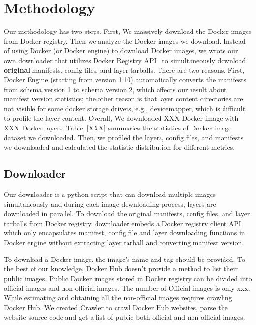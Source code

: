 
\section{Methodology}

Our methodology has two steps. First, We massively download the Docker images from Docker registry. Then we analyze the Docker images we download. Instead of using Docker (or Docker engine) to download Docker images, we wrote our own downloader that utilizes Docker Registry API~\cite{} to simultaneously download \textbf{original} manifests, config files, and layer tarballs. There are two reasons. First, Docker Engine (starting from version 1.10) automatically converts the manifests from schema version 1 to schema version 2, which affects our result about manifest version statistics; the other reason is that layer content directories are not visible for some docker storage drivers, e.g., devicemapper, which is difficult to profile the layer content. Overall, We downloaded XXX Docker image with XXX Docker layers. Table~\ref{XXX} summaries the statistics of Docker image dataset we downloaded. Then, we profiled the layers, config files, and manifests we downloaded and calculated the statistic distribution for different metrics. 


\subsection{Downloader}

Our downloader is a python script that can download multiple images simultaneously and during each image downloading process, layers are downloaded in parallel. To download the original manifests, config files, and layer tarballs from Docker registry, downloader embeds a Docker registry client API~\cite{xxx} which only encapsulates manifest, config file and layer downloading functions in Docker engine without extracting layer tarball and converting manifest version. 

To download a Docker image, the image's name and tag should be provided. To the best of our knowledge, Docker Hub doesn't provide a method to list their public images. Public Docker images stored in Docker registry can be divided into official images and non-official images. The number of Official images is only xxx. While estimating and obtaining all the non-official images requires crawling Docker Hub. We created Crawler to crawl Docker Hub websites, parse the website source code and get a list of public both official and non-official images.

